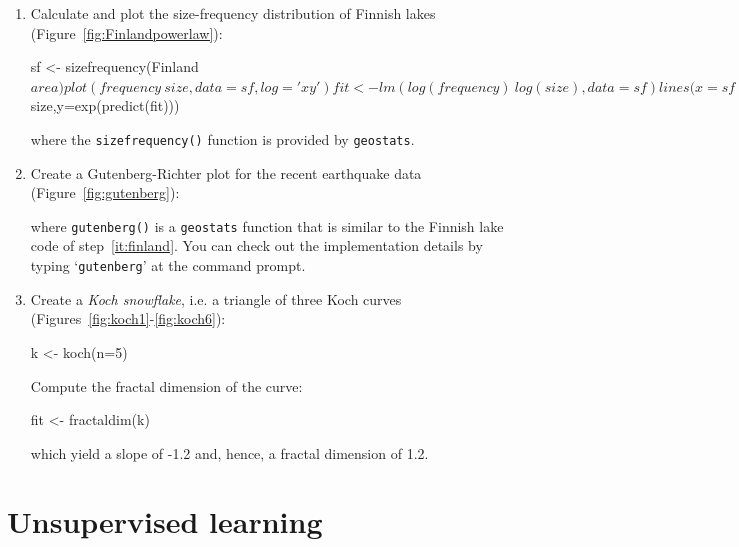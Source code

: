 \begin{enumerate}
  
\item\label{it:finland} Calculate and plot the size-frequency
  distribution of Finnish lakes (Figure~\ref{fig:Finlandpowerlaw}):

\begin{script}
sf <- sizefrequency(Finland$area)
plot(frequency~size,data=sf,log='xy')
fit <- lm(log(frequency)~log(size),data=sf)
lines(x=sf$size,y=exp(predict(fit)))
\end{script}

\noindent where the \texttt{sizefrequency()} function is provided by
\texttt{geostats}.\medskip

\item Create a Gutenberg-Richter plot for the recent earthquake data
  (Figure~\ref{fig:gutenberg}):


\noindent where \texttt{gutenberg()} is a \texttt{geostats} function
that is similar to the Finnish lake code of step~\ref{it:finland}. You
can check out the implementation details by typing
`\texttt{gutenberg}' at the command prompt.

\item Create a \textit{Koch snowflake}, i.e. a triangle of three Koch
  curves (Figures~\ref{fig:koch1}-\ref{fig:koch6}):

\begin{script}
k <- koch(n=5)
\end{script}

Compute the fractal dimension of the curve:

\begin{script}[firstnumber=2]
fit <- fractaldim(k)
\end{script}

\noindent which yield a slope of -1.2 and, hence, a fractal dimension
of 1.2.

\end{enumerate}

\section{Unsupervised learning}
\label{sec:R-unsupervised}

